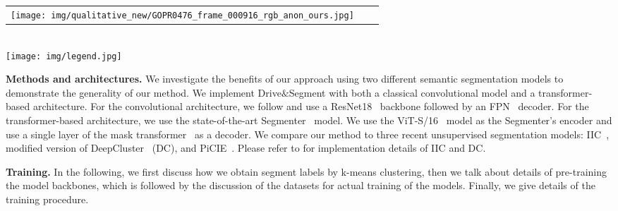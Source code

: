 \documentclass[runningheads]{llncs}
\newcommand{\ours}{Drive$\&$Segment\xspace}
\newcommand{\supp}{appendix\xspace}
\newcommand{\paragraphcustom}[1]{\smallskip\noindent\textbf{#1}}
\begin{document}
\begin{figure*}[t]
\begin{minipage}[t]{0.98\columnwidth}
\begin{tabular}{c@{}c@{}c}
         \texttt{[image: img/qualitative\_new/GOPR0476\_frame\_000916\_rgb\_anon\_ours.jpg]} \\
         \end{tabular}
    \end{minipage}\\
    \texttt{[image: img/legend.jpg]}
    \vspace{-6pt}
    \caption{
        \textbf{Qualitative results} for \emph{unsupervised} semantic segmentation using our \ours approach. To obtain the best matching between our pseudo-classes and the set of ground-truth classes, we use the Hungarian algorithm. The first two rows show samples from the Cityscapes~\cite{Cordts2016Cityscapes} dataset, and the other three rows show samples from the night and fog splits of the ACDC~\cite{SDV21} dataset. Please see Figures~\ref{fig:qualitative_supp},~\ref{fig:qualitative_supp2} and~\ref{fig:qualitative_acdc} in the 
        \supp
        for more qualitative results.
    }
    \label{fig:qualitative}
    \vspace{-4ex}
\end{figure*}

\paragraphcustom{Methods and architectures.}
\label{sec:architecture}
We investigate the benefits of our approach using two different semantic segmentation models to demonstrate the generality of our method. We implement \ours with both a classical convolutional model and a transformer-based architecture. For the convolutional architecture, we follow \cite{cho2021picie} and use a ResNet18~\cite{he2016deep} backbone followed by an FPN~\cite{lin2017feature} decoder. For the transformer-based architecture, we use the state-of-the-art Segmenter~\cite{Strudel_2021_ICCV} model.
We use the ViT-S/16~\cite{dosovitskiy2021image} model as the Segmenter's encoder and use a single layer of the mask transformer~\cite{Strudel_2021_ICCV} as a decoder.
We compare our method to three recent unsupervised segmentation models: IIC~\cite{ji2019invariant}, modified version of DeepCluster~\cite{caron2018deep} (DC), and PiCIE~\cite{cho2021picie}.
Please refer to \cite{cho2021picie} for implementation details of IIC and DC.

\paragraphcustom{Training.}
\label{sec:training_details}
In the following, we first discuss how we obtain segment labels by k-means clustering, then we talk about details of pre-training the model backbones, which is followed by the discussion of the datasets for actual training of the models. Finally, we give details of the training procedure.
\end{document}
